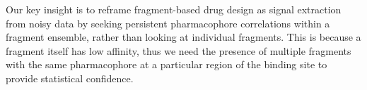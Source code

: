 



Our key insight is to reframe fragment-based drug design as signal extraction from noisy data by seeking persistent pharmacophore correlations within a fragment ensemble, rather than looking at individual fragments. This is because a fragment itself has low affinity, thus we need the presence of multiple fragments with the same pharmacophore at a particular region of the binding site to provide statistical confidence. 

